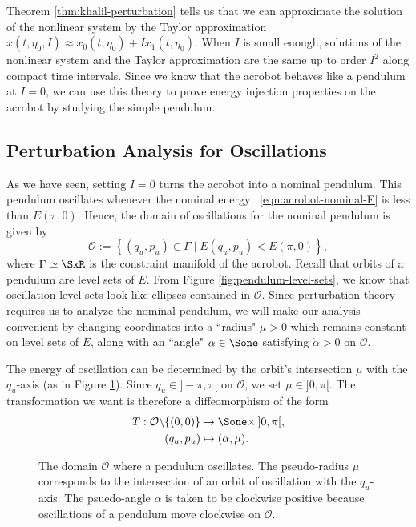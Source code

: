 Theorem \ref{thm:khalil-perturbation} tells us that we can approximate the
solution of the nonlinear system by the Taylor approximation 
\(x(t,\eta_0,I) \approx x_0(t,\eta_0) + I x_1(t,\eta_0)\).
When \(I\) is small enough, solutions of the nonlinear system and
the Taylor approximation are the same up to order \(I^2\) along compact time
intervals.
Since we know that the acrobot behaves like a pendulum at \(I = 0\), we can
use this theory to prove energy injection properties on the acrobot by studying
the simple pendulum.
 
\subsection*{Perturbation Analysis for Oscillations}
As we have seen, setting \(I = 0\) turns the acrobot into a nominal pendulum. 
This pendulum oscillates whenever the nominal energy
~\eqref{eqn:acrobot-nominal-E} is less than \(E(\pi,0)\). 
Hence, the domain of oscillations for the nominal pendulum is given by
\[
    \mathcal{O} := \left\{ (q_u,p_u) \in \Gamma \mid E(q_u,p_u) < E(\pi,0)\right\}
    ,
\]
where \(\Gamma \simeq \SxR\) is the constraint manifold of the
acrobot.
Recall that orbits of a pendulum are level sets of \(E\). 
From Figure \ref{fig:pendulum-level-sets}, we know that oscillation level sets
look like ellipses contained in \(\mathcal{O}\).
Since perturbation theory requires us to analyze the nominal pendulum, we will
make our analysis convenient by changing coordinates into a
``radius" \(\mu > 0\) which remains constant on level sets of \(E\), 
along with an ``angle" \(\alpha \in \Sone\) satisfying \(\dot{\alpha} > 0\) on
\(\mathcal{O}\).

The energy of oscillation can be determined by the orbit's intersection
\(\mu\) with the \(q_u\)-axis (as in Figure \ref{fig:mu-intersection}).
Since \(q_u \in ]-\pi,\pi[\) on \(\mathcal{O}\), we set \(\mu \in ]0,\pi[\).
The transformation we want is therefore a diffeomorphism of the form
\begin{align*}
    T : \mathcal{O} \backslash \{(0,0)\} &\rightarrow \Sone \times \, ]0,\pi[, \\
    (q_u, p_u) &\mapsto (\alpha,\mu)
    .
\end{align*}

\begin{figure}
    \centering
    \caption{The domain \(\mathcal{O}\) where a pendulum oscillates.
    The pseudo-radius \(\mu\) corresponds to the
    intersection of an orbit of oscillation with the \(q_u\)-axis.
    The psuedo-angle \(\alpha\) is taken to be clockwise positive because 
    oscillations of a pendulum move clockwise on \(\mathcal{O}\).}
    \label{fig:mu-intersection}
\end{figure}

